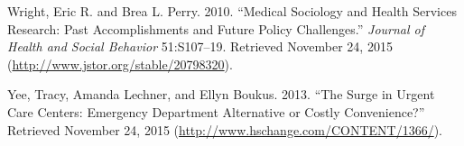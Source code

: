 \documentclass[12pt,twoside]{reedthesis}
\begin{document}
  Wright, Eric R. and Brea L. Perry. 2010. ``Medical Sociology and Health
  Services Research: Past Accomplishments and Future Policy Challenges.''
  \emph{Journal of Health and Social Behavior} 51:S107--19. Retrieved
  November 24, 2015 (\url{http://www.jstor.org/stable/20798320}).
  
  Yee, Tracy, Amanda Lechner, and Ellyn Boukus. 2013. ``The Surge in
  Urgent Care Centers: Emergency Department Alternative or Costly
  Convenience?'' Retrieved November 24, 2015
  (\url{http://www.hschange.com/CONTENT/1366/}).


\end{document}
